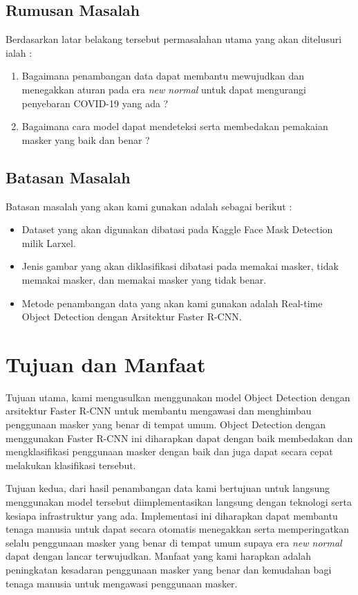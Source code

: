 \documentclass{article}
\begin{document}
		
  	\subsection{Rumusan Masalah}
  		Berdasarkan latar belakang tersebut permasalahan utama yang akan ditelusuri ialah :
  		\begin{enumerate}
  			\item Bagaimana penambangan data dapat membantu mewujudkan dan menegakkan aturan pada era \textit{new normal} untuk dapat mengurangi penyebaran COVID-19 yang ada ?
  			\item Bagaimana cara model dapat mendeteksi serta membedakan pemakaian masker yang baik dan benar ?

  		\end{enumerate}
  	\subsection{Batasan Masalah}
  		Batasan masalah yang akan kami gunakan adalah sebagai berikut :
  		\begin{itemize}
  			\item Dataset yang akan digunakan dibatasi pada Kaggle Face Mask Detection milik Larxel\cite{larxel_2020}.
  			\item Jenis gambar yang akan diklasifikasi dibatasi pada memakai masker, tidak memakai masker, dan memakai masker yang tidak benar.
  			\item Metode penambangan data yang akan kami gunakan adalah Real-time Object Detection dengan Arsitektur Faster R-CNN\cite{NIPS2015_14bfa6bb}.
  		\end{itemize}
  \section{Tujuan dan Manfaat}
  		\par Tujuan utama, kami mengusulkan menggunakan model Object Detection dengan arsitektur Faster R-CNN untuk membantu mengawasi dan menghimbau penggunaan masker yang benar di tempat umum. Object Detection dengan menggunakan Faster R-CNN ini diharapkan dapat dengan baik membedakan dan mengklasifikasi penggunaan masker dengan baik dan juga dapat secara cepat melakukan klasifikasi tersebut.
  		
  		\par Tujuan kedua, dari hasil penambangan data kami bertujuan untuk langsung menggunakan model tersebut diimplementasikan langsung dengan teknologi serta kesiapa infrastruktur yang ada. Implementasi ini diharapkan dapat membantu tenaga manusia untuk dapat secara otomatis menegakkan serta memperingatkan selalu penggunaan masker yang benar di tempat umum supaya era \textit{new normal} dapat dengan lancar terwujudkan. Manfaat yang kami harapkan adalah peningkatan kesadaran penggunaan masker yang benar dan kemudahan bagi tenaga manusia untuk mengawasi penggunaan masker.
\end{document}
